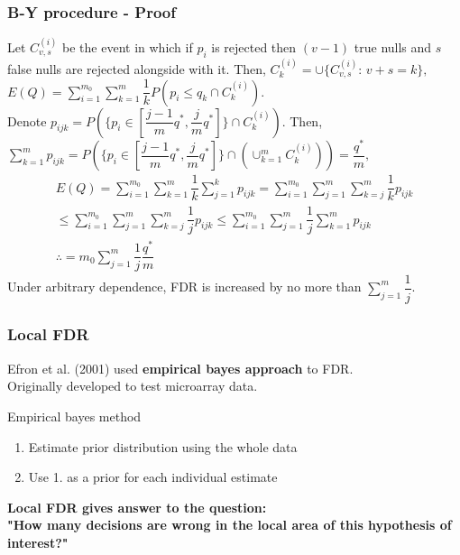 \documentclass{beamer}
\begin{document}
\frame
{
    \frametitle{B-Y procedure - Proof}
    \scriptsize
      Let $C_{v, s}^{(i)}$ be the event in which if $p_i$ is rejected then $(v-1)$ true nulls and $s$ false nulls are rejected alongside with it. Then,
      \center
      $C_k^{(i)}=\cup \{C_{v,s}^{(i)} \text{: } v+s=k \},$ 
      $E(Q)=\sum_{i=1}^{m_0} \sum_{k=1}^m \dfrac{1}{k}P(p_i \leq q_k \cap C_k^{(i)}).$
      \\
      
      \flushleft
      Denote $p_{ijk}=P(\{ p_i \in [\dfrac{j-1}{m}q^*, \dfrac{j}{m}q^*]\} \cap C_k^{(i)})$. Then,
      \center
      $\sum_{k=1}^m p_{ijk}=P(\{ p_i \in [\dfrac{j-1}{m}q^*, \dfrac{j}{m}q^*]\} \cap (\cup_{k=1}^m C_k^{(i)}))=\dfrac{q^*}{m},$
      \begin{align*}
      E(Q)=\sum_{i=1}^{m_0} \sum_{k=1}^{m} \dfrac{1}{k} \sum_{j=1}^{k} p_{ijk} = \sum_{i=1}^{m_0} \sum_{j=1}^{m} \sum_{k=j}^{m} \dfrac{1}{k}p_{ijk}\\
      \leq \sum_{i=1}^{m_0} \sum_{j=1}^{m} \sum_{k=j}^{m} \dfrac{1}{j}p_{ijk} \leq \sum_{i=1}^{m_0} \sum_{j=1}^{m} \dfrac{1}{j} \sum_{k=1}^{m} p_{ijk}\\
      \therefore = m_0 \sum_{j=1}^{m} \dfrac{1}{j} \dfrac{q^*}{m}
      \end{align*}
      \flushleft
      Under arbitrary dependence, FDR is increased by no more than $\sum_{j=1}^m \dfrac{1}{j}$.
}


\frame
{
    \frametitle{Local FDR}
    Efron et al. (2001) used \textbf{empirical bayes approach} to FDR. \vspace{0.07in}\\
    Originally developed to test microarray data. \vspace{0.22in}\\
    \begin{block}{Empirical bayes method}
      \begin{enumerate}
        \item Estimate prior distribution using the whole data
        \item Use 1. as a prior for each individual estimate\vspace{0.1in}\\
      \end{enumerate}
    \end{block}
    \textbf{Local FDR gives answer to the question: \\"How many decisions are wrong in the local area of this hypothesis of interest?"}
}
\end{document}

